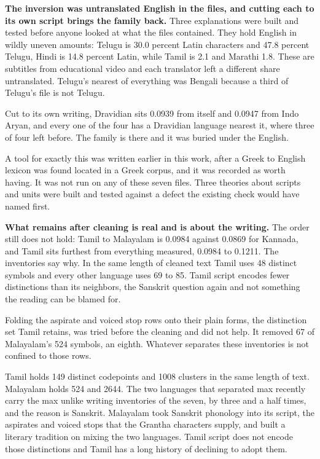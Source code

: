 \textbf{The inversion was untranslated English in the files, and cutting each to its own script brings the family back.} Three explanations were built and tested before anyone looked at what the files contained. They hold English in wildly uneven amounts: Telugu is 30.0 percent Latin characters and 47.8 percent Telugu, Hindi is 14.8 percent Latin, while Tamil is 2.1 and Marathi 1.8. These are subtitles from educational video and each translator left a different share untranslated. Telugu's nearest of everything was Bengali because a third of Telugu's file is not Telugu.

Cut to its own writing, Dravidian sits 0.0939 from itself and 0.0947 from Indo Aryan, and every one of the four has a Dravidian language nearest it, where three of four left before. The family is there and it was buried under the English.

A tool for exactly this was written earlier in this work, after a Greek to English lexicon was found located in a Greek corpus, and it was recorded as worth having. It was not run on any of these seven files. Three theories about scripts and units were built and tested against a defect the existing check would have named first.

\textbf{What remains after cleaning is real and is about the writing.} The order still does not hold: Tamil to Malayalam is 0.0984 against 0.0869 for Kannada, and Tamil sits furthest from everything measured, 0.0984 to 0.1211. The inventories say why. In the same length of cleaned text Tamil uses 48 distinct symbols and every other language uses 69 to 85. Tamil script encodes fewer distinctions than its neighbors, the Sanskrit question again and not something the reading can be blamed for.

Folding the aspirate and voiced stop rows onto their plain forms, the distinction set Tamil retains, was tried before the cleaning and did not help. It removed 67 of Malayalam's 524 symbols, an eighth. Whatever separates these inventories is not confined to those rows.

Tamil holds 149 distinct codepoints and 1008 clusters in the same length of text. Malayalam holds 524 and 2644. The two languages that separated max recently carry the max unlike writing inventories of the seven, by three and a half times, and the reason is Sanskrit. Malayalam took Sanskrit phonology into its script, the aspirates and voiced stops that the Grantha characters supply, and built a literary tradition on mixing the two languages. Tamil script does not encode those distinctions and Tamil has a long history of declining to adopt them.

